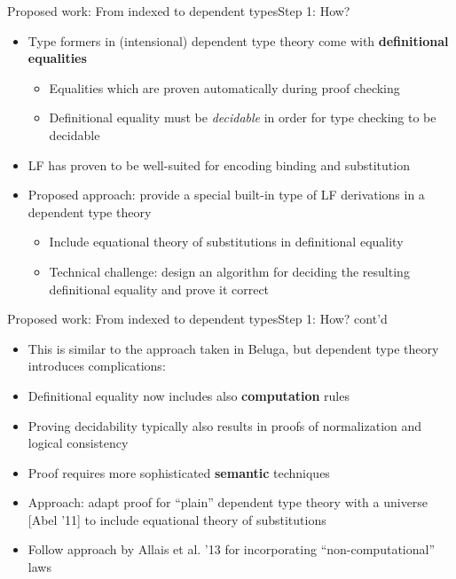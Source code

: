 \documentclass[usenames,dvipsnames]{beamer}
\begin{document}

\begin{frame}{Proposed work: From indexed to dependent types}{Step 1: How?}
\begin{itemize}
\item Type formers in (intensional) dependent type theory come with \textbf{definitional equalities}
\begin{itemize}
\item Equalities which are proven automatically during proof checking
\item Definitional equality must be \emph{decidable} in order for type checking to be decidable
\end{itemize}
\item LF has proven to be well-suited for encoding binding and substitution
\item Proposed approach: provide a special built-in type of LF derivations in a dependent type theory
\begin{itemize}
\item Include equational theory of substitutions in definitional equality
\item Technical challenge: design an algorithm for deciding the resulting definitional equality and prove it correct
\end{itemize}
\end{itemize}
\end{frame}

\begin{frame}{Proposed work: From indexed to dependent types}{Step 1: How? cont'd}
\begin{itemize}
\item This is similar to the approach taken in Beluga, but dependent type theory introduces complications:
\item Definitional equality now includes also \textbf{computation} rules
\item Proving decidability typically also results in proofs of normalization and logical consistency
\item Proof requires more sophisticated \textbf{semantic} techniques
\item Approach: adapt proof for ``plain'' dependent type theory with a universe [Abel '11] to include equational theory of substitutions
\item Follow approach by Allais et al. '13 for incorporating ``non-computational'' laws
\end{itemize}
\end{frame}
\end{document}
